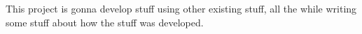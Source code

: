 This project is gonna develop stuff using other existing stuff, all the while writing some stuff about how the stuff was developed. 
